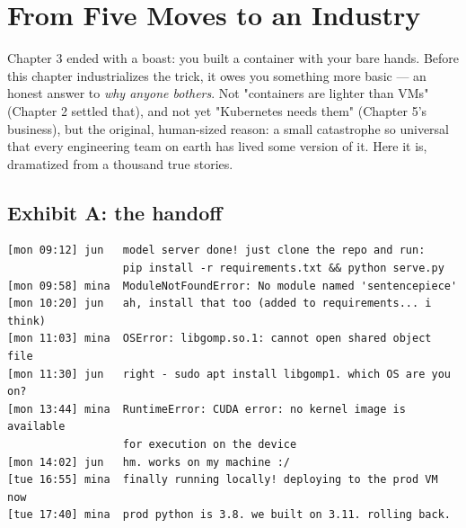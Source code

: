 \section{From Five Moves to an Industry}

Chapter 3 ended with a boast: you built a container with your bare hands. Before this chapter industrializes the trick, it owes you something more basic — an honest answer to \textit{why anyone bothers}. Not "containers are lighter than VMs" (Chapter 2 settled that), and not yet "Kubernetes needs them" (Chapter 5's business), but the original, human-sized reason: a small catastrophe so universal that every engineering team on earth has lived some version of it. Here it is, dramatized from a thousand true stories.

\subsection*{Exhibit A: the handoff}

\begin{terminalbox}
\begin{Verbatim}[breaklines=true,breakanywhere=true,fontsize=\small,formatcom=\color{tbbtermfg},codes=\tbbcodeactive]
[mon 09:12] jun   model server done! just clone the repo and run:
                  pip install -r requirements.txt && python serve.py
[mon 09:58] mina  ModuleNotFoundError: No module named 'sentencepiece'
[mon 10:20] jun   ah, install that too (added to requirements... i think)
[mon 11:03] mina  OSError: libgomp.so.1: cannot open shared object file
[mon 11:30] jun   right - sudo apt install libgomp1. which OS are you on?
[mon 13:44] mina  RuntimeError: CUDA error: no kernel image is available
                  for execution on the device
[mon 14:02] jun   hm. works on my machine :/
[tue 16:55] mina  finally running locally! deploying to the prod VM now
[tue 17:40] mina  prod python is 3.8. we built on 3.11. rolling back.
\end{Verbatim}
\end{terminalbox}

